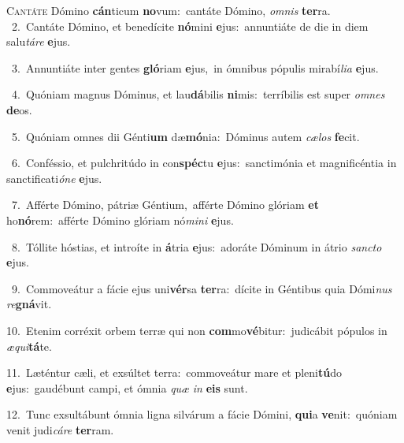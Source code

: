 \lettrine{\initial\textcolor{\initialcolor}{C}}{antáte} Dómino \textbf{cán}\-ticum \textbf{no}\-vum:~\star cantáte Dómino, \textit{om}\-\textit{nis} \textbf{ter}\-ra.\\
{\numbfont\textcolor{\numbcolor}{~2.}}~Cantáte Dómino, et benedícite \textbf{nó}\-mini \textbf{e}\-jus:~\star annuntiáte de die in diem salu\-\textit{tá}\-\textit{re} \textbf{e}\-jus.\par
{\numbfont\textcolor{\numbcolor}{~3.}}~Annuntiáte inter gentes \textbf{gló}\-riam \textbf{e}\-jus,~\star in ómnibus pópulis mirabí\-\textit{li}\-\textit{a} \textbf{e}\-jus.\par
{\numbfont\textcolor{\numbcolor}{~4.}}~Quóniam magnus Dóminus, et lau\-\textbf{dá}\-bilis \textbf{ni}\-mis:~\star terríbilis est super \textit{om}\-\textit{nes} \textbf{de}\-os.\par
{\numbfont\textcolor{\numbcolor}{~5.}}~Quóniam omnes dii Génti\textbf{um} dæ\-\textbf{mó}\-nia:~\star Dóminus autem \textit{cæ}\-\textit{los} \textbf{fe}\-cit.\par
{\numbfont\textcolor{\numbcolor}{~6.}}~Conféssio, et pulchritúdo in con\-\textbf{spéc}\-tu \textbf{e}\-jus:~\star sanctimónia et magnificéntia in sanctificati\-\textit{ó}\-\textit{ne} \textbf{e}\-jus.\par
{\numbfont\textcolor{\numbcolor}{~7.}}~Afférte Dómino, pátriæ Géntium,~\dagger afférte Dómino glóriam \textbf{et} ho\-\textbf{nó}\-rem:~\star afférte Dómino glóriam nó\-\textit{mi}\-\textit{ni} \textbf{e}\-jus.\par
{\numbfont\textcolor{\numbcolor}{~8.}}~Tóllite hóstias, et introíte in \textbf{á}\-tria \textbf{e}\-jus:~\star adoráte Dóminum in átrio \textit{sanc}\-\textit{to} \textbf{e}\-jus.\par
{\numbfont\textcolor{\numbcolor}{~9.}}~Commoveátur a fácie ejus uni\-\textbf{vér}\-sa \textbf{ter}\-ra:~\star dícite in Géntibus quia Dómi\textit{nus} \textit{re}\-\textbf{gná}vit.\par
{\numbfont\textcolor{\numbcolor}{10.}}~Etenim corréxit orbem terræ qui non \textbf{com}\-mo\-\textbf{vé}\-bitur:~\star judicábit pópulos in \textit{æ}\-\textit{qui}\textbf{tá}te.\par
{\numbfont\textcolor{\numbcolor}{11.}}~Læténtur cæli, et exsúltet terra:~\dagger commoveátur mare et pleni\-\textbf{tú}\-do \textbf{e}\-jus:~\star gaudébunt campi, et ómnia \textit{quæ} \textit{in} \textbf{e}\-\textbf{is} sunt.\par
{\numbfont\textcolor{\numbcolor}{12.}}~Tunc exsultábunt ómnia ligna silvárum a fácie Dómini, \textbf{qui}\-a \textbf{ve}\-nit:~\star quóniam venit judi\-\textit{cá}\-\textit{re} \textbf{ter}\-ram.\par
